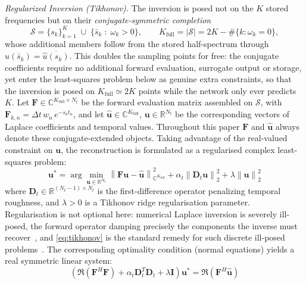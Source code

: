 ﻿\documentclass[a4paper,12pt]{article}
\theoremstyle{definition}
\theoremstyle{remark}
\newcommand{\C}{\mathbb{C}}
\newcommand{\R}{\mathbb{R}}
\begin{document}
\emph{Regularized Inversion (Tikhonov).}
The inversion is posed not on the $K$ stored frequencies but on their \emph{conjugate-symmetric completion}
\begin{equation}
    \mathcal{S} = \{s_k\}_{k=1}^{K} \;\cup\; \{\bar{s}_k \;:\; \omega_k > 0\},
    \qquad
    K_{\mathrm{full}} = |\mathcal{S}| = 2K - \#\{k : \omega_k = 0\},
    \label{eq:sfull}
\end{equation}
whose additional members follow from the stored half-spectrum through $\hat{u}(\bar{s}_k) = \overline{\hat{u}(s_k)}$. This doubles the sampling points for free: the conjugate coefficients require no additional forward evaluation, surrogate output or storage, yet enter the least-squares problem below as genuine extra constraints, so that the inversion is posed on $K_{\mathrm{full}} \simeq 2K$ points while the network only ever predicts $K$. Let $\bm{F} \in \C^{K_{\mathrm{full}} \times N_t}$ be the forward evaluation matrix assembled on $\mathcal{S}$, with $\bm{F}_{k,n} = \Delta t \, w_n \, e^{-s_k t_n}$, and let $\hat{\bm{u}} \in \C^{K_{\mathrm{full}}}$, $\bm{u} \in \R^{N_t}$ be the corresponding vectors of Laplace coefficients and temporal values. Throughout this paper $\bm{F}$ and $\hat{\bm{u}}$ always denote these conjugate-extended objects. Taking advantage of the real-valued constraint on $\bm{u}$, the reconstruction is formulated as a regularised complex least-squares problem:
\begin{equation}
    \bm{u}^* = \arg\min_{\bm{u} \in \R^{N_t}} \left\| \bm{F}\bm{u} - \hat{\bm{u}} \right\|_{\C^{K_{\mathrm{full}}}}^2 + \alpha_t \left\| \bm{D}_t \bm{u} \right\|_2^2 + \lambda \left\| \bm{u} \right\|_2^2
    \label{eq:tikhonov}
\end{equation}
where $\bm{D}_t \in \R^{(N_t-1)\times N_t}$ is the first-difference operator penalizing temporal roughness, and $\lambda > 0$ is a Tikhonov ridge regularisation parameter. Regularisation is not optional here: numerical Laplace inversion is severely ill-posed, the forward operator damping precisely the components the inverse must recover~\cite{epstein2008}, and \eqref{eq:tikhonov} is the standard remedy for such discrete ill-posed problems~\cite{hansen1998}. The corresponding optimality condition (normal equations) yields a real symmetric linear system:
\begin{equation}
    \left( \Re(\bm{F}^H \bm{F}) + \alpha_t \bm{D}_t^T \bm{D}_t + \lambda \bm{I} \right) \bm{u}^* = \Re(\bm{F}^H \hat{\bm{u}})
    \label{eq:normal}
\end{equation}
\end{document}
